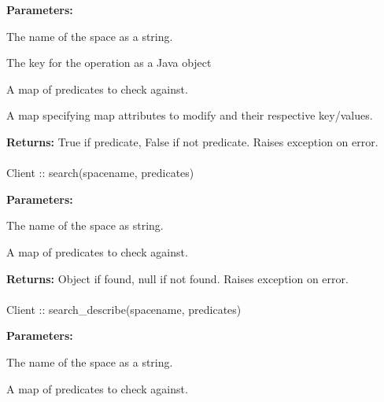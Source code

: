 \noindent\textbf{Parameters:}
\begin{description}[labelindent=\widthof{{\code{mapattributes}}},leftmargin=*,noitemsep,nolistsep,align=right]
\item[\code{spacename}] The name of the space as a string.
\item[\code{key}] The key for the operation as a Java object
\item[\code{predicates}] A map of predicates to check against.
\item[\code{mapattributes}] A map specifying map attributes to modify and their respective key/values.
\end{description}

\noindent\textbf{Returns:}
True if predicate, False if not predicate.  Raises exception on error.

\paragraph{}
\label{api:java:search}
\begin{javacode}
Client :: search(spacename, predicates)
\end{javacode}
\funcdesc 

\noindent\textbf{Parameters:}
\begin{description}[labelindent=\widthof{{\code{predicates}}},leftmargin=*,noitemsep,nolistsep,align=right]
\item[\code{spacename}] The name of the space as string.
\item[\code{predicates}] A map of predicates to check against.
\end{description}

\noindent\textbf{Returns:}
Object if found, null if not found.  Raises exception on error.

\paragraph{}
\label{api:java:search_describe}
\begin{javacode}
Client :: search_describe(spacename, predicates)
\end{javacode}
\funcdesc 

\noindent\textbf{Parameters:}
\begin{description}[labelindent=\widthof{{\code{predicates}}},leftmargin=*,noitemsep,nolistsep,align=right]
\item[\code{spacename}] The name of the space as a string.
\item[\code{predicates}] A map of predicates to check against.
\end{description}

